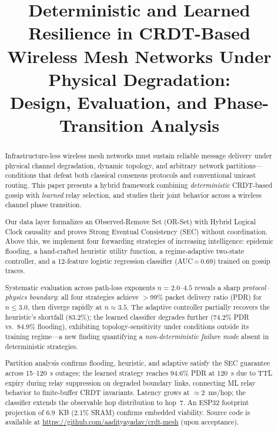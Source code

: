 \documentclass[conference]{IEEEtran}
\begin{document}
\title{Deterministic and Learned Resilience in CRDT-Based\\
       Wireless Mesh Networks Under Physical Degradation:\\
       Design, Evaluation, and Phase-Transition Analysis}

\author{
}
\maketitle

\begin{abstract}
Infrastructure-less wireless mesh networks must sustain reliable message
delivery under physical channel degradation, dynamic topology, and arbitrary
network partitions---conditions that defeat both classical consensus protocols
and conventional unicast routing.  This paper presents a hybrid framework
combining \emph{deterministic} CRDT-based gossip with \emph{learned} relay
selection, and studies their joint behavior across a wireless channel phase
transition.

Our data layer formalizes an Observed-Remove Set (OR-Set) with Hybrid Logical
Clock causality and proves Strong Eventual Consistency (SEC) without
coordination.  Above this, we implement four forwarding strategies of increasing
intelligence: epidemic flooding, a hand-crafted heuristic utility function, a
regime-adaptive two-state controller, and a 12-feature logistic regression
classifier (AUC\,=\,0.69) trained on gossip traces.

Systematic evaluation across path-loss exponents $n = 2.0$--$4.5$ reveals a
sharp \emph{protocol--physics boundary}: all four strategies achieve $>$99\%
packet delivery ratio (PDR) for $n \leq 3.0$, then diverge rapidly at
$n \approx 3.5$.  The adaptive controller partially recovers the heuristic's
shortfall (83.2\%); the learned classifier degrades further (74.2\% PDR vs.\
84.9\% flooding), exhibiting topology-sensitivity under conditions outside its
training regime---a new finding quantifying a \emph{non-deterministic failure
mode} absent in deterministic strategies.

Partition analysis confirms flooding, heuristic, and adaptive satisfy the SEC
guarantee across 15--120~s outages; the learned strategy reaches 94.6\% PDR
at 120~s due to TTL expiry during relay suppression on degraded boundary links,
connecting ML relay behavior to finite-buffer CRDT invariants.  Latency grows
at $\approx$2~ms/hop; the classifier extends the observable hop distribution
to hop~7.  An ESP32 footprint projection of 6.9~KB (2.1\% SRAM) confirms
embedded viability.  Source code is available at
\url{https://github.com/aadityayadav/crdt-mesh} (upon acceptance).
\end{abstract}
\end{document}

